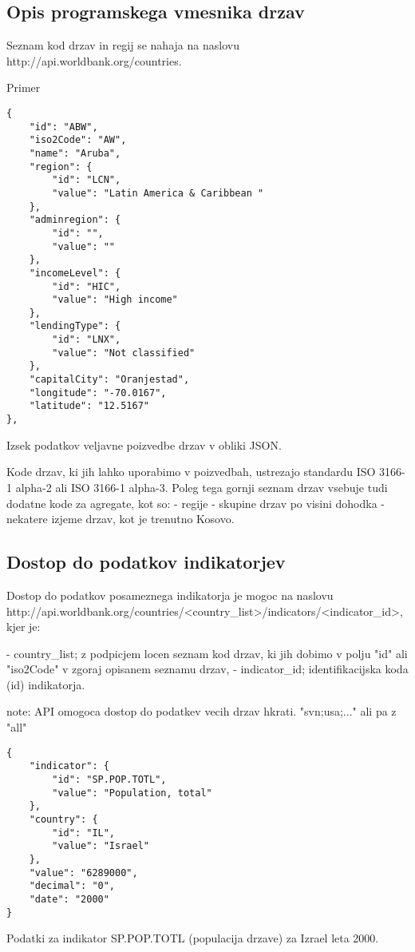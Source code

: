 \subsection{Opis programskega vmesnika drzav}
Seznam kod drzav in regij se nahaja na naslovu 
http://api.worldbank.org/countries.

Primer

\begin{snippet}
\begin{center}
\begin{lstlisting}
{
    "id": "ABW",
    "iso2Code": "AW",
    "name": "Aruba",
    "region": {
        "id": "LCN",
        "value": "Latin America & Caribbean "
    },
    "adminregion": {
        "id": "",
        "value": ""
    },
    "incomeLevel": {
        "id": "HIC",
        "value": "High income"
    },
    "lendingType": {
        "id": "LNX",
        "value": "Not classified"
    },
    "capitalCity": "Oranjestad",
    "longitude": "-70.0167",
    "latitude": "12.5167"
},
\end{lstlisting}
\end{center}
\caption[some]{Izsek podatkov veljavne poizvedbe  drzav v obliki JSON.
}

\label{country_response}
\end{snippet} 

Kode drzav, ki jih lahko uporabimo v poizvedbah, ustrezajo standardu ISO 
3166-1  
alpha-2 ali ISO 3166-1 alpha-3.
Poleg tega gornji seznam drzav vsebuje tudi dodatne kode za agregate, kot so:
- regije
- skupine drzav po visini dohodka
- nekatere izjeme drzav, kot je trenutno Kosovo.



\subsection{Dostop do podatkov indikatorjev}
Dostop do podatkov posameznega indikatorja je mogoc na naslovu
http://api.worldbank.org/countries/<country\_list>/indicators/<indicator\_id>,
kjer je:

- country\_list; z podpicjem locen seznam kod drzav, ki jih dobimo v polju "id"
ali "iso2Code" v zgoraj opisanem seznamu drzav,
- indicator\_id; identifikacijska koda (id) indikatorja.


note: API omogoca dostop do podatkev vecih drzav hkrati. "svn;usa;..." ali pa
z "all"


\begin{snippet}
\begin{center}
\begin{lstlisting}
{
    "indicator": {
        "id": "SP.POP.TOTL",
        "value": "Population, total"
    },
    "country": {
        "id": "IL",
        "value": "Israel"
    },
    "value": "6289000",
    "decimal": "0",
    "date": "2000"
}
\end{lstlisting}
\end{center}
\caption{Podatki za indikator SP.POP.TOTL (populacija drzave) za Izrael leta
2000.}
\label{country_response}
\end{snippet} 


